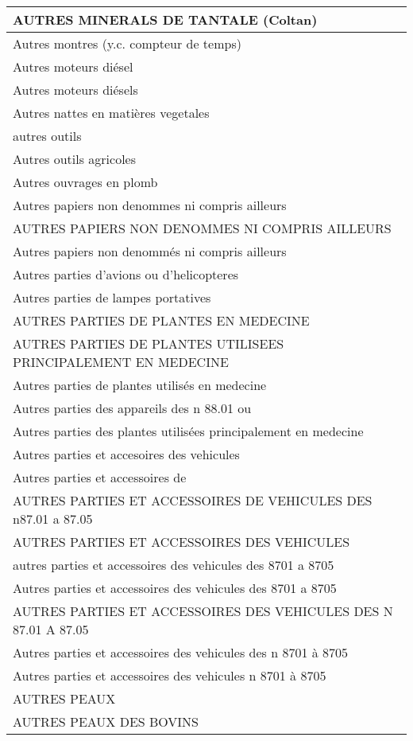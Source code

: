 \documentclass[
]{book}
\begin{document}
\begin{table}
\begin{tabular}[t]{l}
AUTRES MINERALS DE TANTALE (Coltan)\\
\hline
Autres montres (y.c. compteur de temps)\\
\hline
Autres moteurs diésel\\
\hline
Autres moteurs diésels\\
\hline
Autres nattes en matières vegetales\\
\hline
autres outils\\
\hline
Autres outils agricoles\\
\hline
Autres ouvrages en plomb\\
\hline
Autres papiers non denommes ni compris ailleurs\\
\hline
AUTRES PAPIERS NON DENOMMES NI COMPRIS AILLEURS\\
\hline
Autres papiers non denommés ni compris ailleurs\\
\hline
Autres parties d'avions ou d'helicopteres\\
\hline
Autres parties de lampes portatives\\
\hline
AUTRES PARTIES DE PLANTES EN MEDECINE\\
\hline
AUTRES PARTIES DE PLANTES UTILISEES PRINCIPALEMENT EN MEDECINE\\
\hline
Autres parties de plantes utilisés en medecine\\
\hline
Autres parties des appareils des n 88.01 ou\\
\hline
Autres parties des plantes utilisées principalement en medecine\\
\hline
Autres parties et accesoires des vehicules\\
\hline
Autres parties et accessoires de\\
\hline
AUTRES PARTIES ET ACCESSOIRES DE VEHICULES DES n87.01 a 87.05\\
\hline
AUTRES PARTIES ET ACCESSOIRES DES VEHICULES\\
\hline
autres parties et accessoires des vehicules des 8701 a 8705\\
\hline
Autres parties et accessoires des vehicules des 8701 a 8705\\
\hline
AUTRES PARTIES ET ACCESSOIRES DES VEHICULES DES N 87.01 A 87.05\\
\hline
Autres parties et accessoires des vehicules des n 8701 à 8705\\
\hline
Autres parties et accessoires des vehicules n 8701 à 8705\\
\hline
AUTRES PEAUX\\
\hline
AUTRES PEAUX DES BOVINS\\

\end{tabular}
\end{table}
\end{document}
